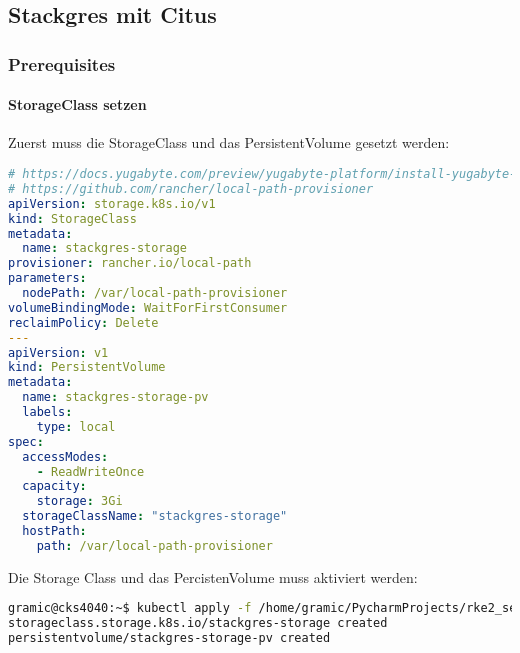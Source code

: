 
\subsection{Stackgres mit Citus}
\label{subsec:evaluation_installation_stackgres}
\subsubsection{Prerequisites}
\paragraph{StorageClass setzen}
Zuerst muss die StorageClass und das PersistentVolume gesetzt werden:
\lstset{style=gra_codestyle}
\begin{lstlisting}[language=yaml, caption=StackGres-Citus - StorageClass setzen,captionpos=b,label={lst:stackgres-citus-storageclass-yaml},breaklines=true]
# https://docs.yugabyte.com/preview/yugabyte-platform/install-yugabyte-platform/prepare-environment/kubernetes/#configure-storage-class
# https://github.com/rancher/local-path-provisioner
apiVersion: storage.k8s.io/v1
kind: StorageClass
metadata:
  name: stackgres-storage
provisioner: rancher.io/local-path
parameters:
  nodePath: /var/local-path-provisioner
volumeBindingMode: WaitForFirstConsumer
reclaimPolicy: Delete
---
apiVersion: v1
kind: PersistentVolume
metadata:
  name: stackgres-storage-pv
  labels:
    type: local
spec:
  accessModes:
    - ReadWriteOnce
  capacity:
    storage: 3Gi
  storageClassName: "stackgres-storage"
  hostPath:
    path: /var/local-path-provisioner
\end{lstlisting}

Die Storage Class und das PercistenVolume muss aktiviert werden:
\lstset{style=gra_codestyle}
\begin{lstlisting}[language=bash, caption=yugabyteDB - StorageClass / PersistentVolume aktivieren,captionpos=b,label={lst:stackgres_citus-storageclass-apply},breaklines=true]
gramic@cks4040:~$ kubectl apply -f /home/gramic/PycharmProjects/rke2_settings/stackgres_citus/stackgres_citus/storageclass.yaml
storageclass.storage.k8s.io/stackgres-storage created
persistentvolume/stackgres-storage-pv created
\end{lstlisting}
